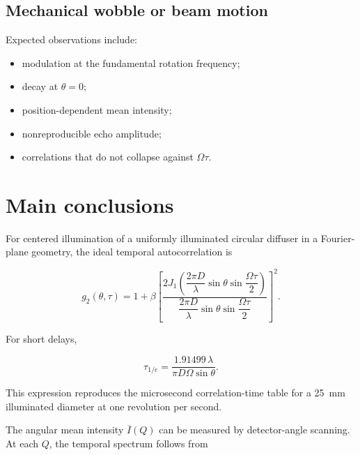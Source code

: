 \documentclass[11pt]{article}
\begin{document}
\subsection{Mechanical wobble or beam motion}

Expected observations include:

\begin{itemize}
    \item modulation at the fundamental rotation frequency;
    \item decay at $\theta=0$;
    \item position-dependent mean intensity;
    \item nonreproducible echo amplitude;
    \item correlations that do not collapse against $\Omega\tau$.
\end{itemize}

\section{Main conclusions}

For centered illumination of a uniformly illuminated circular diffuser in a
Fourier-plane geometry, the ideal temporal autocorrelation is

\begin{equation}
    g_2(\theta,\tau)
    =
    1+
    \beta
    \left[
        \frac{
            2J_1\left(
                \dfrac{2\pi D}{\lambda}
                \sin\theta
                \sin\dfrac{\Omega\tau}{2}
            \right)
        }{
            \dfrac{2\pi D}{\lambda}
            \sin\theta
            \sin\dfrac{\Omega\tau}{2}
        }
    \right]^2.
\end{equation}

For short delays,

\begin{equation}
    \tau_{1/e}
    =
    \frac{
        1.91499\,\lambda
    }{
        \pi D\Omega\sin\theta
    }.
\end{equation}

This expression reproduces the microsecond correlation-time table for a
\SI{25}{\milli\meter} illuminated diameter at one revolution per second.

The angular mean intensity $\overline{I}(Q)$ can be measured by detector-angle
scanning. At each $Q$, the temporal spectrum follows from
\end{document}
